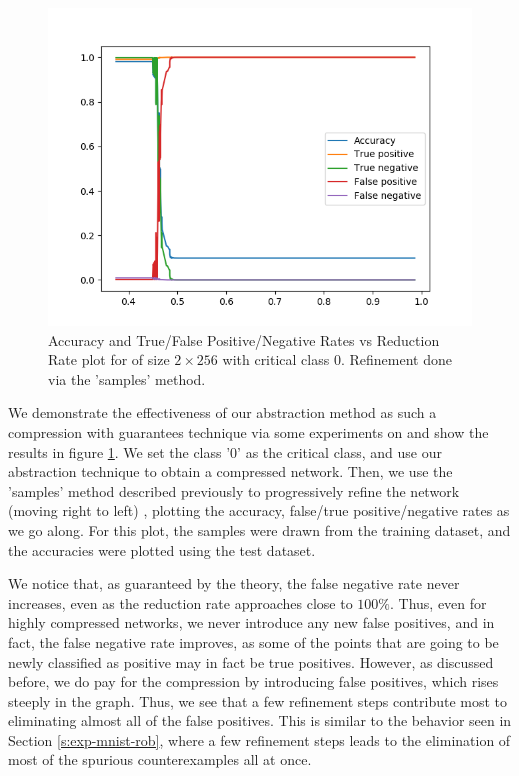\begin{figure}
    \includegraphics[scale=0.6]{figs/mnist_2_256_class_samples.png}
    \caption{Accuracy and True/False Positive/Negative Rates vs Reduction Rate
        plot for \mnist of size $2 \times 256$ with critical class 0. Refinement
    done via the 'samples' method. }
    \label{f:mnist-class-samples}
\end{figure}

We demonstrate the effectiveness of our abstraction method as such a compression
with guarantees technique via some experiments on \mnist and show the results in
figure \ref{f:mnist-class-samples}. We set the class '0'
as the critical class, and use our abstraction technique to obtain a compressed
network. Then, we use the 'samples' method described previously to progressively
refine the network (moving right to left) , plotting the accuracy, false/true
positive/negative rates as we go along. For this plot, the samples were drawn
from the \mnist training dataset, and the accuracies were plotted using the
\mnist test dataset.

We notice that, as guaranteed by the theory, the false negative rate never
increases, even as the reduction rate approaches close to $100\%$. Thus, even
for highly compressed networks, we never introduce any new false positives, and
in fact, the false negative rate improves, as some of the points that are going
to be newly classified as positive may in fact be true positives. However, as
discussed before, we do pay for the compression by introducing false positives,
which rises steeply in the graph. Thus, we see that a few refinement steps
contribute most to eliminating almost all of the false positives. 
This is similar to the behavior seen in Section \ref{s:exp-mnist-rob}, where a few
refinement steps leads to the elimination of most of the spurious
counterexamples all at once. 

